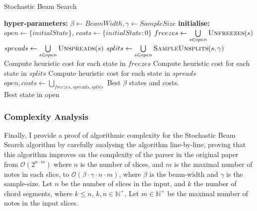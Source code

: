 \documentclass[12pt,a4paper,twoside,openany]{report} \usepackage[pdfborder={0 0 0}]{hyperref}    %
\theoremstyle{definition} \newtheorem{definition}{Definition}[section]
\begin{document}
 \begin{algorithm}[h] 
   \caption{Stochastic Beam Search} 
   \label{code:stbs0}
   \begin{algorithmic}[1]
    \State \textbf{hyper-parameters: } $\beta \gets BeamWidth, \gamma \gets SampleSize$ 
    \State \textbf{initialise: } $open \gets \{initialState\}$, $costs \gets \{initialState: 0 \}$
    \State $freezes \gets \bigcup\limits_{s \in open} \Call{Unfreezes}{s}$ 
    \State $spreads \gets \bigcup\limits_{s \in open} \Call{Unspreads}{s}$ 
    \State $splits \gets \bigcup\limits_{s \in open} \Call{SampleUnsplits}{s, \gamma}$ 
    \State Compute heuristic cost for each state in $freezes$ 
    \State Compute heuristic cost for each state in $splits$ 
    \State Compute heuristic cost for each state in $spreads$ 
    \State $open, costs \gets \bigcup\limits_{freezes, spreads, splits}$ Best $\beta$ states and costs.
    \EndWhile \\
  \Return Best state in open 
  \end{algorithmic} 
  \end{algorithm}

\subsubsection{Complexity Analysis}
\label{sub:complexityAnalaysis}

Finally, I provide a proof of algorithmic complexity for the Stochastic Beam Search algorithm by carefully analysing the
algorithm line-by-line, proving that this algorithm improves on the complexity of the parser in the original paper from $\mathcal{O}(2^{n\cdot m})$ where $n$ is
the number of slices, and $m$ is the maximal number of notes in each slice, to $\mathcal{O}(\beta \cdot \gamma \cdot
n \cdot m)$, where $\beta$ is the beam-width and $\gamma$ is the sample-size.
Let $n$ be the number of slices in the input, and $k$ the number of chord segments, where $k \leq n$, $k,n \in
\mathbb{N}^{+}$. Let $m \in \mathbb{N}^{+}$ be the maximal number of notes in the input slices. 
\end{document}
